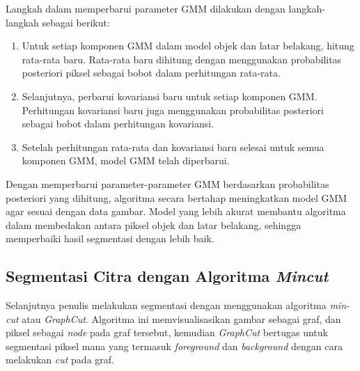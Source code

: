 Langkah dalam memperbarui parameter GMM dilakukan dengan langkah-langkah sebagai berikut:
\begin{enumerate}
    \item Untuk setiap komponen GMM dalam model objek dan latar belakang, hitung 
    rata-rata baru. Rata-rata baru dihitung dengan menggunakan probabilitas posteriori 
    piksel sebagai bobot dalam perhitungan rata-rata.
    \item Selanjutnya, perbarui kovariansi baru untuk setiap komponen GMM. Perhitungan 
    kovariansi baru juga menggunakan probabilitas posteriori sebagai bobot dalam 
    perhitungan kovariansi.
    \item Setelah perhitungan rata-rata dan kovariansi baru selesai untuk semua 
    komponen GMM, model GMM telah diperbarui.
\end{enumerate}

Dengan memperbarui parameter-parameter GMM berdasarkan probabilitas posteriori yang 
dihitung, algoritma secara bertahap meningkatkan model GMM agar sesuai dengan data gambar. 
Model yang lebih akurat membantu algoritma dalam membedakan antara piksel objek dan 
latar belakang, sehingga memperbaiki hasil segmentasi dengan lebih baik.


\subsection{Segmentasi Citra dengan Algoritma \emph{Mincut}}

Selanjutnya penulis melakukan segmentasi dengan menggunakan algoritma \emph{min-cut}
atau \emph{GraphCut}. Algoritma ini memvisualisasikan gambar sebagai graf, dan piksel 
sebagai \emph{node} pada graf tersebut, kemudian \emph{GraphCut} bertugas untuk 
segmentasi piksel mana yang termasuk \emph{foreground} dan \emph{background} dengan cara
melakukan \emph{cut} pada graf. 



